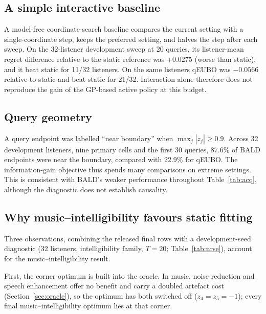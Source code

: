 \documentclass[preprint,12pt]{elsarticle}
\begin{document}
\subsection{A simple interactive baseline}

A model-free coordinate-search baseline compares the current setting with a single-coordinate step, keeps the preferred setting, and halves the step after each sweep. On the 32-listener development sweep at 20 queries, its listener-mean regret difference relative to the static reference was $+0.0275$ (worse than static), and it beat static for 11/32 listeners. On the same listeners qEUBO was $-0.0566$ relative to static and beat static for 21/32. Interaction alone therefore does not reproduce the gain of the GP-based active policy at this budget.

\subsection{Query geometry}

A query endpoint was labelled ``near boundary'' when $\max_j |z_j|\geq0.9$. Across 32 development listeners, nine primary cells and the first 30 queries, 87.6\% of BALD endpoints were near the boundary, compared with 22.9\% for qEUBO. The information-gain objective thus spends many comparisons on extreme settings. This is consistent with BALD's weaker performance throughout Table~\ref{tab:acq}, although the diagnostic does not establish causality.

\subsection{Why music--intelligibility favours static fitting}
\label{sec:nrse}

Three observations, combining the released final rows with a development-seed diagnostic (32 listeners, intelligibility family, $T=20$; Table~\ref{tab:nrse}), account for the music--intelligibility result.

First, the corner optimum is built into the oracle. In music, noise reduction and speech enhancement offer no benefit and carry a doubled artefact cost (Section~\ref{sec:oracle}), so the optimum has both switched off ($z_4=z_5=-1$); every final music--intelligibility optimum lies at that corner.
\end{document}
